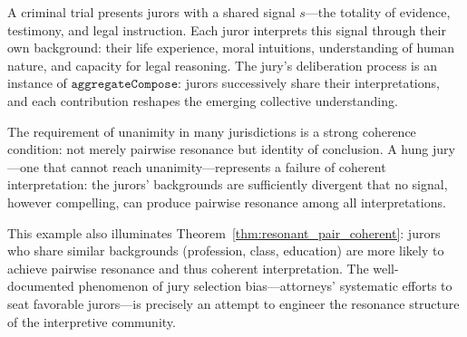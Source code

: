 \begin{example}
\label{ex:jury_deliberation}
A criminal trial presents jurors with a shared signal $s$---the totality
of evidence, testimony, and legal instruction.  Each juror interprets
this signal through their own background: their life experience, moral
intuitions, understanding of human nature, and capacity for legal
reasoning.  The jury's deliberation process is an instance of
$\texttt{aggregateCompose}$: jurors successively share their interpretations,
and each contribution reshapes the emerging collective understanding.

The requirement of unanimity in many jurisdictions is a strong coherence
condition: not merely pairwise resonance but identity of conclusion.
A hung jury---one that cannot reach unanimity---represents a failure
of coherent interpretation: the jurors' backgrounds are sufficiently
divergent that no signal, however compelling, can produce pairwise
resonance among all interpretations.

This example also illuminates Theorem~\ref{thm:resonant_pair_coherent}:
jurors who share similar backgrounds (profession, class, education) are
more likely to achieve pairwise resonance and thus coherent interpretation.
The well-documented phenomenon of jury selection bias---attorneys'
systematic efforts to seat favorable jurors---is precisely an attempt
to engineer the resonance structure of the interpretive community.
\end{example}

